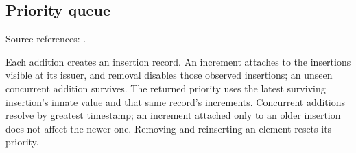 \subsection{Priority queue}
\label{app:dt-add-wins-priority-queue}

\noindent Source references: \cite{PriorityQueue2023}.


Each addition creates an insertion record. An increment attaches to the
insertions visible at its issuer, and removal disables those observed
insertions; an unseen concurrent addition survives. The returned priority
uses the latest surviving insertion's innate value and that same record's
increments. Concurrent additions resolve by greatest timestamp; an increment
attached only to an older insertion does not affect the newer one. Removing
and reinserting an element resets its priority.

